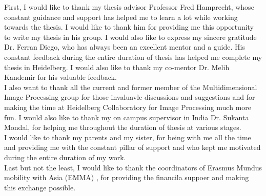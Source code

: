 
\begin{acknowledgements}      

First, I would like to thank my thesis advisor Professor Fred Hamprecht, whose constant guidance and support has helped me to learn a lot while working towards the thesis. I would like to thank him for providing me this opportunity to write my thesis in his group. I would also like to express my sincere gratitude Dr. Ferran Diego, who has always been an excellent mentor and a guide. His constant feedback during the entire duration of thesis has helped me complete my thesis in Heidelberg. I would also like to thank my co-mentor Dr. Melih Kandemir for his valuable feedback.\\

I also want to thank all the current and former member of the Multidimensional Image Processing group for those invaluavle discussions and suggestions and  for making the time at Heidelberg Collaboratory for Image Processing much more fun.
I would also like to thank my on campus supervisor in India Dr. Sukanta Mondal, for helping me throughout the duration of thesis at various stages.\\

I would like to thank my parents and my sister, for being with me all the time and providing me with the constant pillar of support and who kept me motivated during the entire duration of my work.\\

Last but not the least, I would like to thank the coordinators of Erasmus Mundus mobility with Asia (EMMA) , for providing the financila suppoer and making this exchange possible. 


\end{acknowledgements}

